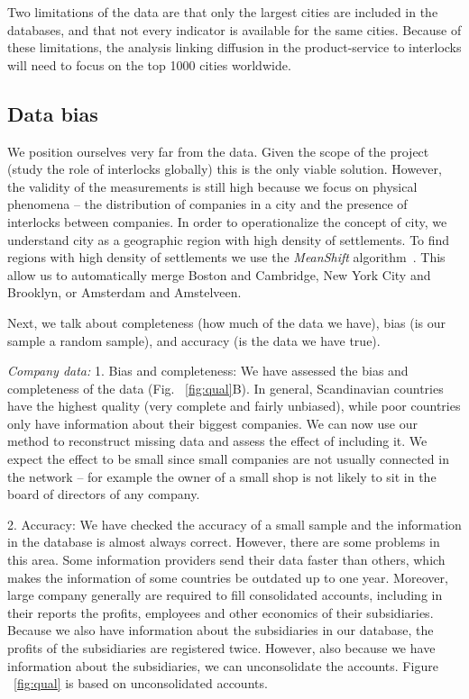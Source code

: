 Two limitations of the data are that only the largest cities are included in the databases, 
and that not every indicator is available for the same cities.
Because of these limitations, the analysis linking diffusion in the product-service to interlocks will need to focus on the top 1000 cities worldwide.


\iffalse
\subsection{Data bias}
We position ourselves very far from the data. 
Given the scope of the project (study the role of interlocks globally) this is the only viable solution.  
However, the validity of the measurements is still high because we focus on physical phenomena 
-- the distribution of companies in a city and the presence of interlocks between companies.
In order to operationalize the concept of city, 
we understand city as a geographic region with high density of settlements.
To find regions with high density of settlements 
we use the \textit{MeanShift} algorithm~\citep{fukunaga1975}.
This allow us to automatically merge Boston and Cambridge, New York City and Brooklyn, or Amsterdam and Amstelveen.


Next, we talk about completeness (how much of the data we have), 
bias (is our sample a random sample), 
and accuracy (is the data we have true). 

\textit{Company data: }
1. Bias and completeness: 
We have assessed the bias and completeness of the data (Fig. ~\ref{fig:qual}B). 
In general, Scandinavian countries have the highest quality (very complete and fairly unbiased), 
while poor countries only have information about their biggest companies.
We can now use our method to reconstruct missing data and assess the effect of including it. 
We expect the effect to be small since small companies are not usually connected in the network -- for example the owner of a small shop is not likely to sit in the board of directors of any company.

2.  Accuracy: 
We have checked the accuracy of a small sample and the information in the database is almost always correct. 
However, there are some problems in this area. 
Some information providers send their data faster than others, which makes the information of some countries be outdated up to one year. 
Moreover, large company generally are required to fill consolidated accounts, 
including in their reports the profits, employees and other economics of their subsidiaries. 
Because we also have information about the subsidiaries in our database, 
the profits of the subsidiaries are registered twice.
However, also because we have information about the subsidiaries,
we can unconsolidate the accounts.
Figure ~\ref{fig:qual} is based on unconsolidated accounts.

